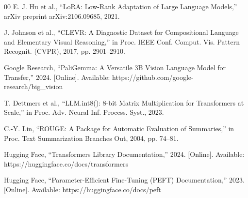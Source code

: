 \documentclass[conference]{IEEEtran}
\begin{document}
\begin{thebibliography}{00}
 E. J. Hu et al., ``LoRA: Low-Rank Adaptation of Large Language Models,'' arXiv preprint arXiv:2106.09685, 2021.

 J. Johnson et al., ``CLEVR: A Diagnostic Dataset for Compositional Language and Elementary Visual Reasoning,'' in Proc. IEEE Conf. Comput. Vis. Pattern Recognit. (CVPR), 2017, pp. 2901--2910.

 Google Research, ``PaliGemma: A Versatile 3B Vision Language Model for Transfer,'' 2024. [Online]. Available: https://github.com/google-research/big\_vision

 T. Dettmers et al., ``LLM.int8(): 8-bit Matrix Multiplication for Transformers at Scale,'' in Proc. Adv. Neural Inf. Process. Syst., 2023.

 C.-Y. Lin, ``ROUGE: A Package for Automatic Evaluation of Summaries,'' in Proc. Text Summarization Branches Out, 2004, pp. 74--81.

 Hugging Face, ``Transformers Library Documentation,'' 2024. [Online]. Available: https://huggingface.co/docs/transformers

 Hugging Face, ``Parameter-Efficient Fine-Tuning (PEFT) Documentation,'' 2023. [Online]. Available: https://huggingface.co/docs/peft
\end{thebibliography}
\end{document}

